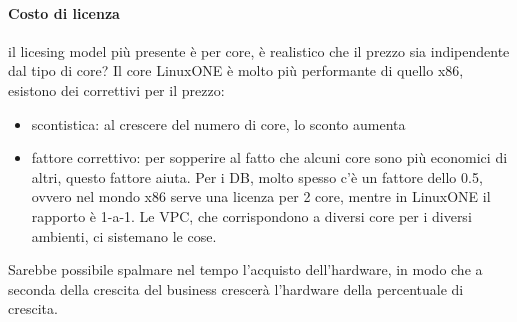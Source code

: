 \documentclass{article}
\begin{document}
\paragraph{Costo di licenza}il licesing model più presente è per core, è realistico che il prezzo sia indipendente dal tipo di core? Il core LinuxONE è molto più performante di quello x86, esistono dei correttivi per il prezzo:
\begin{itemize}
\item scontistica: al crescere del numero di core, lo sconto aumenta
\item fattore correttivo: per sopperire al fatto che alcuni core sono più economici di altri, questo fattore aiuta. Per i DB, molto spesso c'è un fattore dello 0.5, ovvero nel mondo x86 serve una licenza per 2 core, mentre in LinuxONE il rapporto è 1-a-1. Le VPC, che corrispondono a diversi core per i diversi ambienti, ci sistemano le cose.
\end{itemize}
Sarebbe possibile spalmare nel tempo l'acquisto dell'hardware, in modo che a seconda della crescita del business crescerà l'hardware della percentuale di crescita.
\end{document}
